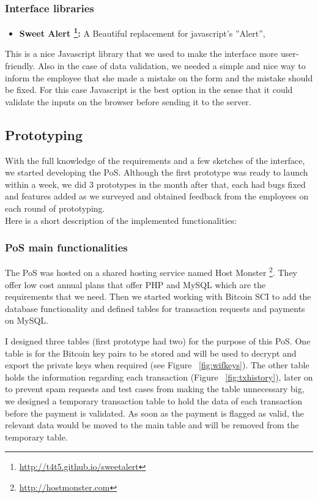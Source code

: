 \subsubsection{Interface libraries}
\begin{itemize}
\item \textbf{Sweet Alert \footnote{\url{http://t4t5.github.io/sweetalert}}: }  A Beautiful replacement for javascript's ''Alert'', 
\end{itemize}

This is a nice Javascript library that we used to make the interface more user-friendly. Also in the case of data validation, we needed a simple and nice way to inform the employee that she made a mistake on the form and the mistake should be fixed. For this case Javascript is the best option in the sense that it could validate the inputs on the browser before sending it to the server.


\subsection{Prototyping}
With the full knowledge of the requirements and a few sketches of the interface, we started developing the PoS. Although the first prototype was ready to launch within a week, we did 3 prototypes in the month after that, each had bugs fixed and features added as we surveyed and obtained feedback from the employees on each round of prototyping.
\\
Here is a short description of the implemented functionalities:

\subsubsection{PoS main functionalities}
The PoS was hosted on a shared hosting service named Host Monster \footnote{\url{http://hostmonster.com}}. They offer low cost annual plans that offer PHP and MySQL which are the requirements that we need.
Then we started working with Bitcoin SCI to add the database functionality and defined tables for transaction requests and payments on MySQL.

I designed three tables (first prototype had two) for the purpose of this PoS. One table is for the Bitcoin key pairs to be stored and will be used to decrypt and export the private keys when required (see Figure ~\ref{fig:wifkeys}). The other table holds the information regarding each transaction (Figure ~\ref{fig:txhistory}), later on to prevent spam requests and test cases from making the table unnecessary big, we designed a temporary transaction table to hold the data of each transaction before the payment is validated. As soon as the payment is flagged as valid, the relevant data would be moved to the main table and will be removed from the temporary table.

